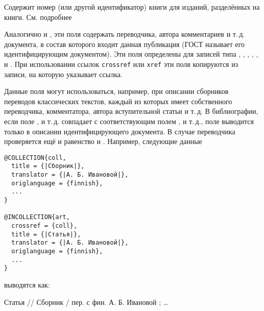 \documentclass[10pt,a4paper,headings=small,numbers=enddot,english,russian]{ltxdockit}[2011/03/25]
\newcommand*{\noitemspace}{\vspace{-\itemsep}\vspace{-\parsep}\vspace{-.6ex}}
\newenvironment{bibexample}{\begin{list}
     {}
     {\setlength{\leftmargin}{\parindent}%
      \setlength{\itemindent}{-\leftmargin}%
      \setlength{\parsep}{0pt}}}
  {\end{list}}
\begin{document}
\begin{fieldlist}


Содержит номер (или другой идентификатор) книги для изданий, разделённых на книги. См. подробнее

\noitemspace%
\noitemspace%
\noitemspace%
\noitemspace%
\noitemspace%
\noitemspace%
\noitemspace%

Аналогично  и , эти поля
содержать переводчика, автора комментариев и т.\,д. документа, в состав которого входит
данная публикация (ГОСТ называет его идентифицирующим документом).
Эти поля определены для записей типа
, , , ,
, 
и .  При использовании ссылок \texttt{crossref} или \texttt{xref}
эти поля копируются из записи, на которую указывает ссылка.

Данные поля могут использоваться, например, при описании сборников переводов классических текстов,
каждый из которых имеет собственного переводчика, комментатора, автора вступительной статьи
и т.\,д. В библиографии, если поле ,  и т.\,д.
совпадает с соответствующим полем ,  и т.\,д.,
поле выводится только в описании идентифицирующего документа. В случае переводчика проверяется
ещё и равенство  и . Например,
следующие данные

\begin{lstlisting}[style=bibtex,escapechar=|]
@COLLECTION{coll,
  title = {|Сборник|},
  translator = {|А. Б. Ивановой|},
  origlanguage = {finnish},
  ...
}

@INCOLLECTION{art,
  crossref = {coll},
  title = {|Статья|},
  translator = {|А. Б. Ивановой|},
  origlanguage = {finnish},
  ...
}
\end{lstlisting}

выводятся как:

\begin{bibexample}
\item Статья // Сборник / пер. с фин. А. Б. Ивановой ; \ldots
\end{bibexample}


\end{fieldlist}
\end{document}
